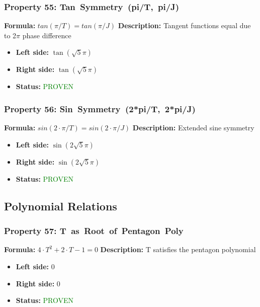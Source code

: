 \subsubsection*{Property 55: Tan~Symmetry~(pi/T,~pi/J)}
\textbf{Formula:} $tan(\pi/T) = tan(\pi/J)$
\textbf{Description:} Tangent functions equal due to 2$\pi$ phase difference

\begin{itemize}
\item \textbf{Left side:} $\tan{\left(\sqrt{5} \pi \right)}$
\item \textbf{Right side:} $\tan{\left(\sqrt{5} \pi \right)}$
\item \textbf{Status:} \textcolor{green}{PROVEN}
\end{itemize}

\subsubsection*{Property 56: Sin~Symmetry~(2*pi/T,~2*pi/J)}
\textbf{Formula:} $sin(2 \cdot \pi/T) = sin(2 \cdot \pi/J)$
\textbf{Description:} Extended sine symmetry

\begin{itemize}
\item \textbf{Left side:} $\sin{\left(2 \sqrt{5} \pi \right)}$
\item \textbf{Right side:} $\sin{\left(2 \sqrt{5} \pi \right)}$
\item \textbf{Status:} \textcolor{green}{PROVEN}
\end{itemize}


\subsection{Polynomial Relations}

\subsubsection*{Property 57: T~as~Root~of~Pentagon~Poly}
\textbf{Formula:} $4 \cdot T^2 + 2 \cdot T - 1 = 0$
\textbf{Description:} T satisfies the pentagon polynomial

\begin{itemize}
\item \textbf{Left side:} $0$
\item \textbf{Right side:} $0$
\item \textbf{Status:} \textcolor{green}{PROVEN}
\end{itemize}

